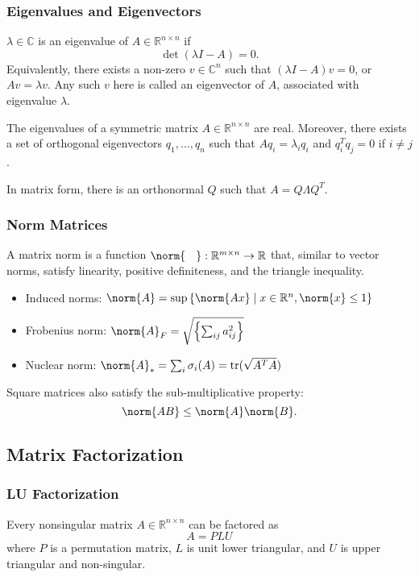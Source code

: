 \documentclass[11pt]{article}
\begin{document}
\subsubsection*{Eigenvalues and Eigenvectors}
$\lambda \in \mathbb{C}$ is an eigenvalue of $A \in \mathbb{R}^{n\times n}$ if 
\[ \det(\lambda I - A) = 0. \] 
Equivalently, there exists a non-zero $v \in \mathbb{C}^n$ such that $(\lambda I - A)v = 0$, or $Av = \lambda v$. Any such $v$ here is called an eigenvector of $A$, associated with eigenvalue $\lambda$. \par 
The eigenvalues of a symmetric matrix $A \in \mathbb{R}^{n\times n}$ are real. Moreover, there exists a set of orthogonal eigenvectors $q_1, \ldots, q_n$ such that $Aq_i = \lambda_iq_i$ and $q_i^Tq_j = 0$ if $i \neq j$. \par 
In matrix form, there is an orthonormal $Q$ such that $A = Q\Lambda Q^T$.

\subsubsection*{Norm Matrices}
A matrix norm is a function $\norm{\phantom{~.~}}: \mathbb{R}^{m\times n} \rightarrow \mathbb{R}$ that, similar to vector norms, satisfy linearity, positive definiteness, and the triangle inequality. \par
\begin{itemize}
    \item Induced norms: $\norm{A} = \sup \left\{ \norm{Ax} \mid x \in \mathbb{R}^n, \norm{x} \leq 1 \right\}$
    \item Frobenius norm: $\norm{A}_F = \sqrt{\left\{ \sum_{ij} a_{ij}^2 \right\}}$
    \item Nuclear norm: $\norm{A}_* = \sum_i \sigma_i(A) = \mathrm{tr}(\sqrt{A^TA})$  
\end{itemize} 
Square matrices also satisfy the sub-multiplicative property: 
\[ \norm{AB} \leq \norm{A}\norm{B}. \] 

\subsection{Matrix Factorization} 
\subsubsection*{LU Factorization} 
Every nonsingular matrix $A \in \mathbb{R}^{n\times n}$ can be factored as 
\[ A = PLU \] 
where $P$ is a permutation matrix, $L$ is unit lower triangular, and $U$ is upper triangular and non-singular. 
\end{document}
